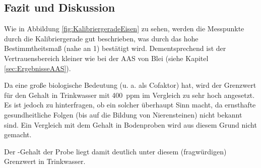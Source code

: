 \subsection{Fazit und Diskussion}
  
  Wie in Abbildung \ref{fig:KalibriergeradeEisen} zu sehen, werden die Messpunkte durch die Kalibriergerade gut beschrieben, was durch das hohe Bestimmtheitsmaß (nahe an 1) bestätigt wird. Dementsprechend ist der Vertrauensbereich kleiner wie bei der AAS von Blei (siehe Kapitel \ref{sec:ErgebnisseAAS}). 
  
  Da  eine große biologische Bedeutung (u. a. als Cofaktor) hat, wird der Grenzwert für den Gehalt in Trinkwasser mit \SI[mode=text]{400}{ppm} im Vergleich zu  sehr hoch angesetzt.\citep{CalciumGrenzwert} Es ist jedoch zu hinterfragen, ob ein solcher überhaupt Sinn macht, da ernsthafte gesundheitliche Folgen (bis auf die Bildung von Nierensteinen) nicht bekannt sind. Ein Vergleich mit dem Gehalt in Bodenproben wird aus diesem Grund nicht gemacht. 
  
  Der -Gehalt der Probe liegt damit deutlich unter diesem (fragwürdigen) Grenzwert in Trinkwasser. 